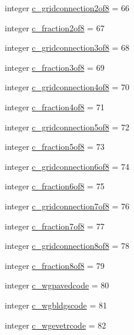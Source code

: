 \begin{DoxyCompactItemize}
integer \hyperlink{namespacecolnamesinputfiles_ab7547e93170074b4d8a1f092873025d7}{c\+\_\+gridconnection2of8} = 66
\item 
integer \hyperlink{namespacecolnamesinputfiles_a9e8fc5ec0c0d392b768329df0ba35ae8}{c\+\_\+fraction2of8} = 67
\item 
integer \hyperlink{namespacecolnamesinputfiles_a0a5d0387553b34f4035c1a5492b2b708}{c\+\_\+gridconnection3of8} = 68
\item 
integer \hyperlink{namespacecolnamesinputfiles_a7dc4f8fad3fcfba44f0c11887c982d0a}{c\+\_\+fraction3of8} = 69
\item 
integer \hyperlink{namespacecolnamesinputfiles_a94605351c2bc647a9ab4b50d7ba81e1c}{c\+\_\+gridconnection4of8} = 70
\item 
integer \hyperlink{namespacecolnamesinputfiles_a092d6542451ef7d49fb50b3504355de5}{c\+\_\+fraction4of8} = 71
\item 
integer \hyperlink{namespacecolnamesinputfiles_a09cb69ff74d4afb51c51777f9fccff6b}{c\+\_\+gridconnection5of8} = 72
\item 
integer \hyperlink{namespacecolnamesinputfiles_abc1fddbcf2bc7e7888dff943c4a34d25}{c\+\_\+fraction5of8} = 73
\item 
integer \hyperlink{namespacecolnamesinputfiles_acae555cfa7c96195f0f67c38e46b7871}{c\+\_\+gridconnection6of8} = 74
\item 
integer \hyperlink{namespacecolnamesinputfiles_a23cba8a25cd6aeafcb11be5adfa89e21}{c\+\_\+fraction6of8} = 75
\item 
integer \hyperlink{namespacecolnamesinputfiles_a749a3e57d412ea8b71e6e7a1cbddd11d}{c\+\_\+gridconnection7of8} = 76
\item 
integer \hyperlink{namespacecolnamesinputfiles_a92a1fd944f732b14683407980521496e}{c\+\_\+fraction7of8} = 77
\item 
integer \hyperlink{namespacecolnamesinputfiles_acf30958a5c5ea1ff51ecae398f3ebf4e}{c\+\_\+gridconnection8of8} = 78
\item 
integer \hyperlink{namespacecolnamesinputfiles_ac1ff83c3a5cb074f626d5c76e069a319}{c\+\_\+fraction8of8} = 79
\item 
integer \hyperlink{namespacecolnamesinputfiles_a594c158d8ed907d4e8ede7a8d0fc9240}{c\+\_\+wgpavedcode} = 80
\item 
integer \hyperlink{namespacecolnamesinputfiles_ab4583c3dc51d01a6708d3728f2d0bbed}{c\+\_\+wgbldgscode} = 81
\item 
integer \hyperlink{namespacecolnamesinputfiles_acd1aae2c74f1010dc8e96721d060ee2f}{c\+\_\+wgevetrcode} = 82

\end{DoxyCompactItemize}

